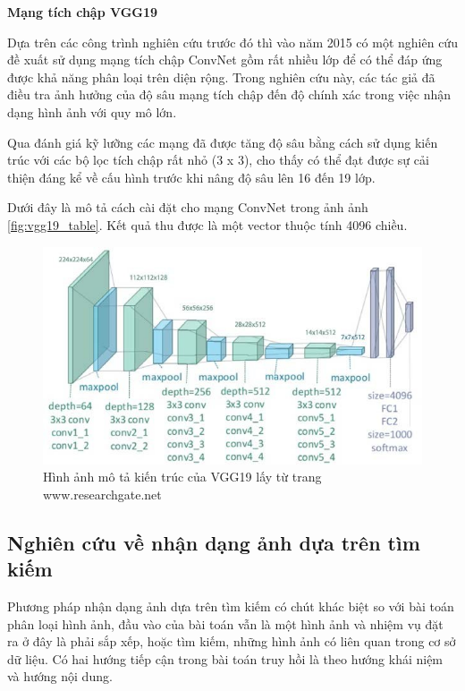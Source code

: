\documentclass[12pt]{report}
\begin{document}
																								
		\textbf{Mạng tích chập VGG19 \cite{cia_vgg19}}
																										
		Dựa trên các công trình nghiên cứu trước đó thì vào năm 2015 có một nghiên cứu \cite{cia_vgg19} đề xuất sử dụng mạng tích chập ConvNet \cite{cia_vgg19} gồm rất nhiều lớp để có thể đáp ứng được khả năng phân loại trên diện rộng. Trong nghiên cứu này, các tác giả đã điều tra ảnh hưởng của độ sâu mạng tích chập đến độ chính xác trong việc nhận dạng hình ảnh với quy mô lớn.  
																										
		Qua đánh giá kỹ lưỡng các mạng đã được tăng độ sâu bằng cách sử dụng kiến trúc với các bộ lọc tích chập rất nhỏ (3 x 3), cho thấy có thể đạt được sự cải thiện đáng kể về cấu hình trước khi nâng độ sâu lên 16 đến 19 lớp.
																										
		Dưới đây là mô tả cách cài đặt cho mạng ConvNet trong ảnh  ảnh \ref{fig:vgg19_table}. Kết quả thu được là một vector thuộc tính 4096 chiều.
				\begin{figure}[h]
			\centering
			\includegraphics[scale=0.7]{vgg19_image}
			\caption{Hình ảnh mô tả kiến trúc của VGG19 \cite{cia_vgg19} lấy từ trang www.researchgate.net}
			\label{fig:vgg19_image}
		\end{figure}				\newpage
																								
		
																										
		\subsection{Nghiên cứu về nhận dạng ảnh dựa trên tìm kiếm \cite{image_retrival} }
																										
		Phương pháp nhận dạng ảnh dựa trên tìm kiếm \cite{image_retrival} có chút khác biệt so với bài toán phân loại hình ảnh, đầu vào của bài toán vẫn là một hình ảnh và nhiệm vụ đặt ra ở đây là phải sắp xếp, hoặc tìm kiếm, những hình ảnh có liên quan trong cơ sở dữ liệu. Có hai hướng tiếp cận trong bài toán truy hồi là theo hướng khái niệm và hướng nội dung.
																								
\end{document}
